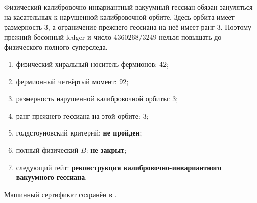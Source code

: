 \begin{nogocriterion}
Физический калибровочно-инвариантный вакуумный гессиан обязан зануляться
на касательных к нарушенной калибровочной орбите. Здесь орбита имеет
размерность $3$, а ограничение прежнего гессиана на неё имеет ранг $3$.
Поэтому прежний босонный ledger и число $4360268/3249$ нельзя повышать до
физического полного суперследа.
\end{nogocriterion}

\begin{protocol}
\begin{enumerate}
 \item физический хиральный носитель фермионов: \textbf{$42$};
 \item фермионный четвёртый момент: \textbf{$92$};
 \item размерность нарушенной калибровочной орбиты: \textbf{$3$};
 \item ранг прежнего гессиана на этой орбите: \textbf{$3$};
 \item голдстоуновский критерий: \textbf{не пройден};
 \item полный физический $B$: \textbf{не закрыт};
 \item следующий гейт: \textbf{реконструкция калибровочно-инвариантного
 вакуумного гессиана}.
\end{enumerate}
\end{protocol}

Машинный сертификат сохранён в
.